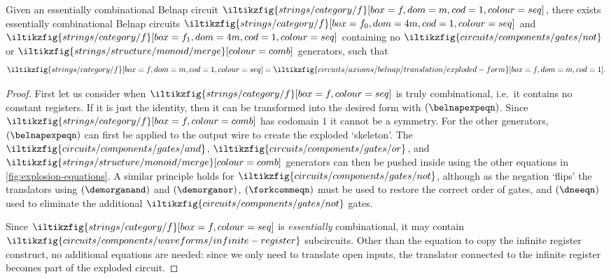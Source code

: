 \begin{proposition}\label{prop:exploded-belnap}
    Given an essentially combinational Belnap circuit \(
    \iltikzfig{strings/category/f}[box=f,dom=m,cod=1,colour=seq]
    \), there exists essentially combinational Belnap circuits \(
    \iltikzfig{strings/category/f}[box=f_0,dom=4m,cod=1,colour=seq]
    \) and \(
    \iltikzfig{strings/category/f}[box=f_1,dom=4m,cod=1,colour=seq]
    \) containing no \(
    \iltikzfig{circuits/components/gates/not}
    \) or \(
    \iltikzfig{strings/structure/monoid/merge}[colour=comb]
    \) generators, such that \[
        \iltikzfig{strings/category/f}[box=f,dom=m,cod=1,colour=seq]
        =
        \iltikzfig{circuits/axioms/belnap/translation/exploded-form}[box=f,dom=m,cod=1].
    \]
\end{proposition}
\begin{proof}
    First let us consider when \(
    \iltikzfig{strings/category/f}[box=f,colour=seq]
    \) is truly combinational, i.e.\ it contains no constant registers.
    If it is just the identity, then it can be transformed into the desired form
    with
    \((\belnapexpeqn)\).
    Since \(\iltikzfig{strings/category/f}[box=f,colour=comb]\) has codomain
    \(1\) it cannot be a symmetry.
    For the other generators, \((\belnapexpeqn)\) can first be
    applied to the output wire to create the exploded `skeleton'.
    The \(
    \iltikzfig{circuits/components/gates/and}
    \), \(
    \iltikzfig{circuits/components/gates/or}
    \), and \(
    \iltikzfig{strings/structure/monoid/merge}[colour=comb]
    \) generators can then be pushed inside using the other equations in
    \cref{fig:explosion-equations}.
    A similar principle holds for \(
    \iltikzfig{circuits/components/gates/not}
    \), although as the negation `flips' the translators using
    \((\demorganand)\) and \((\demorganor)\), \((\forkcommeqn)\) must be used to
    restore the correct order of gates, and \((\dneeqn)\) used to eliminate the
    additional \(\iltikzfig{circuits/components/gates/not}\) gates.

    Since \(
    \iltikzfig{strings/category/f}[box=f,colour=seq]
    \) is \emph{essentially} combinational, it may contain \(
    \iltikzfig{circuits/components/waveforms/infinite-register}
    \) subcircuits.
    Other than the equation to copy the infinite register construct, no
    additional equations are needed: since we only
    need to translate open inputs, the translator connected to the infinite
    register becomes part of the exploded circuit.


\end{proof}
